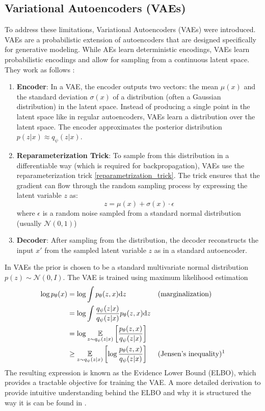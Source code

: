 \subsection{Variational Autoencoders (VAEs)}
To address these limitations, Variational Autoencoders (VAEs) were introduced. VAEs are a 
probabilistic extension of autoencoders that are designed specifically for generative 
modeling. While AEs learn deterministic encodings, VAEs learn probabilistic encodings and 
allow for sampling from a continuous latent space. They work as follows :

\begin{enumerate}
    \item \textbf{Encoder}: In a VAE, the encoder outputs two vectors: the mean $\mu(x)$ and the standard deviation
    $\sigma(x)$  of a distribution (often a Gaussian distribution) in the latent space. Instead of producing a single 
    point in the latent space like in regular autoencoders, VAEs learn a distribution over the latent space.
    The encoder approximates the posterior distribution $p(z|x) \approx q_\psi(z|x)$.%
    \item \textbf{Reparameterization Trick}: To sample from this distribution in a 
    differentiable way (which is required for backpropagation), VAEs use the reparameterization trick \ref{reparametrization_trick}. 
    The trick ensures that the gradient can flow 
    through the random sampling process by expressing the latent variable $z$ as: $$z = 
    \mu(x)+\sigma(x) \cdot \epsilon$$ where $\epsilon$ is a random noise sampled from a 
    standard normal distribution (usually $\mathcal{N}(0,1)$)
    \item \textbf{Decoder}: After sampling from the distribution, the decoder reconstructs the input $x'$ from the sampled 
    latent variable $z$ as in a standard autoencoder.
\end{enumerate}
In VAEs the prior is chosen to be a standard multivariate normal distribution $p(z) \sim \mathcal{N}(0,I)$. The VAE is trained 
using maximum likelihood estimation
\begin{align*}
   \log{p_\theta(x)} &= \log{\int p_\theta(z,x)} \mathrm{d}z && \text{(marginalization)} \\
   &= \log{ \int \frac{q_\psi(z|x)}{q_\psi(z|x)} p_\theta(z,x)} \mathrm{d}z \\
   &= \log{\underset{z \sim q_\psi(z|x)}{\mathbb{E}}\left[\frac{p_\theta(z,x)} {q_\psi(z|x)}\right]} \\
   &\geq  \underset{z \sim q_\psi(z|x)}{\mathbb{E}}\left[\log{\frac{p_\theta(z,x)} {q_\psi(z|x)}}\right]  && 
    \text{(Jensen's inequality)\footnotemark}
\end{align*}
The resulting expression is known as the Evidence Lower Bound (ELBO), which provides a tractable objective for training the
VAE. A more detailed derivation to provide intuitive understanding behind the ELBO and why it is structured the way it is can 
be found in  \cite{luo2022understandingdiffusionmodelsunified}.


